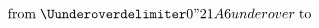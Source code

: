 \documentclass{article}
\begin{document}
\[
  \text{from} \mathrel{\Uunderoverdelimiter 0 "21A6 {under} {over}} \text{to}
\]
\end{document}
